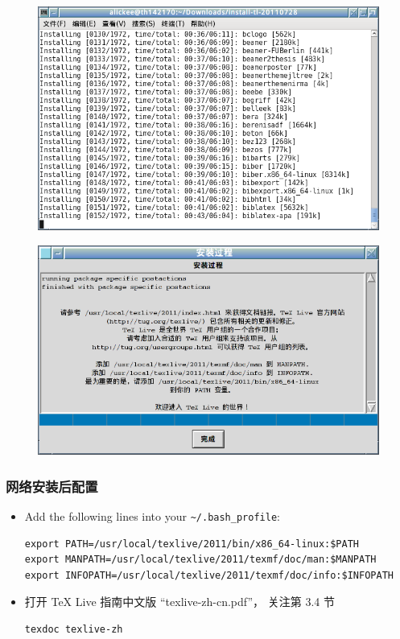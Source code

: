 \documentclass{beamer}
\def\TeXLive{\TeX{} Live\xspace}
\begin{document}
\begin{frame}
  \begin{figure}[h]
  \centering
\includegraphics[scale=0.45]{term.png}
  \end{figure}
\end{frame}

\begin{frame}
  \begin{figure}[h]
  \centering
\includegraphics[scale=0.5]{安装过程.png}
  \end{figure}
\end{frame}

\begin{frame}[fragile]
  \frametitle{网络安装后配置}
\begin{itemize}
  \item
    Add the following lines into your \nolinkurl{~/.bash_profile}:
    \begin{lstlisting}
export PATH=/usr/local/texlive/2011/bin/x86_64-linux:$PATH
export MANPATH=/usr/local/texlive/2011/texmf/doc/man:$MANPATH
export INFOPATH=/usr/local/texlive/2011/texmf/doc/info:$INFOPATH
    \end{lstlisting}

  \item
打开 \TeXLive 指南中文版 ``texlive-zh-cn.pdf''，
关注第 3.4 节
  \begin{lstlisting}
texdoc texlive-zh
  \end{lstlisting}

\end{itemize}
\end{frame}
\end{document}
